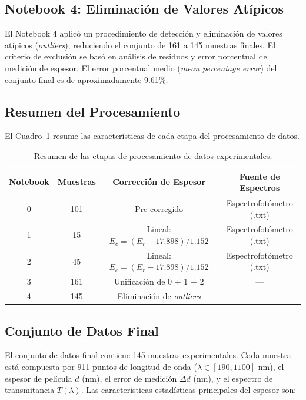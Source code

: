 \documentclass{article}
\begin{document}
\subsection{Notebook 4: Eliminaci\'on de Valores At\'ipicos}

El Notebook 4 aplic\'o un procedimiento de detecci\'on y eliminaci\'on de valores at\'ipicos (\textit{outliers}), reduciendo el conjunto de 161 a 145 muestras finales. El criterio de exclusi\'on se bas\'o en an\'alisis de residuos y error porcentual de medici\'on de espesor. El error porcentual medio (\textit{mean percentage error}) del conjunto final es de aproximadamente 9.61\%.

\subsection{Resumen del Procesamiento}

El Cuadro~\ref{tab:notebook-summary} resume las caracter\'isticas de cada etapa del procesamiento de datos.

\begin{table}[htbp]
\centering
\caption{Resumen de las etapas de procesamiento de datos experimentales.}
\label{tab:notebook-summary}
\begin{tabular}{@{}cccc@{}}
\toprule
\textbf{Notebook} & \textbf{Muestras} & \textbf{Correcci\'on de Espesor} & \textbf{Fuente de Espectros} \\
\midrule
0 & 101 & Pre-corregido & Espectrofot\'ometro (.txt) \\
1 & 15  & Lineal: $E_c = (E_r - 17.898)/1.152$ & Espectrofot\'ometro (.txt) \\
2 & 45  & Lineal: $E_c = (E_r - 17.898)/1.152$ & Espectrofot\'ometro (.txt) \\
3 & 161 & Unificaci\'on de 0 + 1 + 2 & --- \\
4 & 145 & Eliminaci\'on de \textit{outliers} & --- \\
\bottomrule
\end{tabular}
\end{table}

\subsection{Conjunto de Datos Final}

El conjunto de datos final contiene 145 muestras experimentales. Cada muestra est\'a compuesta por 911 puntos de longitud de onda ($\lambda \in [190, 1100]$ nm), el espesor de pel\'icula $d$ (nm), el error de medici\'on $\Delta d$ (nm), y el espectro de transmitancia $T(\lambda)$. Las caracter\'isticas estad\'isticas principales del espesor son:
\end{document}
